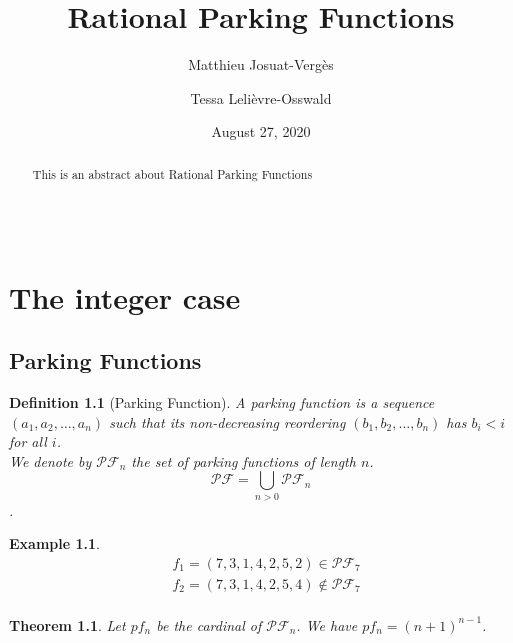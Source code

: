 \documentclass[12pt]{report}
\newtheorem{theorem}{Theorem}
\newtheorem{definition}{Definition}
\newtheorem*{example}{Example}
\begin{document}
\title{Rational Parking Functions}
\author{Matthieu Josuat-Vergès \and Tessa Lelièvre-Osswald}
\date{August 27, 2020}

\maketitle

\begin{abstract}
    This is an abstract about Rational Parking Functions
\end{abstract}

\begin{displaymath}
\end{displaymath}

\chapter{The integer case}

\section{Parking Functions}

\begin{definition}[Parking Function]
    A \emph{parking function} is a sequence $(a_1, a_2, \ldots, a_n)$
    such that its non-decreasing reordering $(b_1, b_2, \ldots, b_n)$
    has $b_i < i$ for all $i$.\\
    We denote by $\mathcal{PF}_n$ the set of parking functions of length $n$.
    $$\mathcal{PF} = \bigcup_{n > 0}{\mathcal{PF}_n}$$.
\end{definition}

\begin{example}
    \begin{align*}
    &f_1 = (7, 3, 1, 4, 2, 5, 2) \in \mathcal{PF}_7\\
    &f_2 = (7, 3, 1, 4, 2, 5, 4) \notin \mathcal{PF}_7\\
    \end{align*}
\end{example}

\begin{theorem}
    Let $pf_n$ be the cardinal of $\mathcal{PF}_n$.
    We have $pf_n = (n + 1)^{n-1}$.
\end{theorem}
\end{document}
